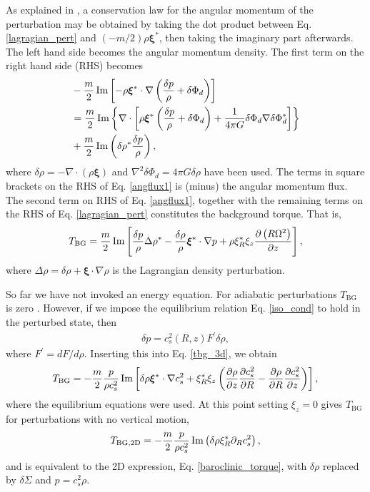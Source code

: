 As explained in \cite{lin11b}, a conservation law for the angular
momentum of the perturbation may be obtained by taking the dot product
between Eq. \ref{lagragian_pert} and $(-m/2)\rho\bm{\xi}^*$, then
taking the imaginary part afterwards. The left hand side becomes the
angular momentum density. The first term on the right hand side (RHS)
becomes 
\begin{align}\label{angflux1}
  &-\frac{m}{2}\operatorname{Im}\left[-\rho\bm{\xi}^*\cdot\nabla\left(\frac{\delta p}{\rho} + \delta
    \Phi_d\right)\right] \notag\\ 
&= \frac{m}{2}\operatorname{Im}\left\{\nabla\cdot\left[\rho\bm{\xi}^*\left(\frac{\delta p}{\rho} + \delta
    \Phi_d \right) + \frac{1}{4\pi
    G}\delta\Phi_d\nabla\delta\Phi_d^*\right]\right\} \notag\\
&+ \frac{m}{2}\operatorname{Im}\left(\delta\rho^*\frac{\delta p}{\rho}\right),
\end{align}
where $\delta\rho = - \nabla\cdot\left(\rho\bm{\xi}\right)$ and
$\nabla^2\delta\Phi_d = 4\pi G \delta \rho$ have been used. The 
terms in square brackets on the RHS of Eq. \ref{angflux1} is (minus) the 
angular momentum flux. The second term on RHS of Eq. \ref{angflux1}, 
together with the remaining terms on the RHS of 
Eq. \ref{lagragian_pert} constitutes the background torque. That is, 
\begin{align}\label{tbg_3d}
  T_\mathrm{BG} = \frac{m}{2}\operatorname{Im}\left[
    \frac{\delta p}{\rho} \Delta\rho^* -
    \frac{\delta\rho}{\rho}\bm{\xi}^*\cdot\nabla p  
    + \rho \xi_R^*\xi_z\frac{\partial\left(R\Omega^2\right)}{\partial z}\right],
\end{align}
where $\Delta\rho = \delta\rho + \bm{\xi}\cdot\nabla\rho$ is the
Lagrangian density perturbation. 

So far we have not invoked an energy equation. For 
adiabatic perturbations $T_\mathrm{BG}$ is zero
\citep{lin93b}. However, if we impose the equilibrium relation
Eq. \ref{iso_cond} to hold in the perturbed state, then
\begin{align}
  \delta p = c_s^2(R,z) F^\prime \delta\rho,
\end{align}
where $F^\prime = dF/d\rho$. Inserting this into Eq. \ref{tbg_3d}, we
obtain
\begin{align}\label{tbg_3d_2}
  T_\mathrm{BG} = -\frac{m}{2}\frac{p}{\rho
    c_s^2}\operatorname{Im}\left[\delta\rho\bm{\xi}^*\cdot\nabla c_s^2 +
    \xi_R^*\xi_z \left(\frac{\partial\rho}{\partial z}\frac{\partial c_s^2}{\partial R} -
      \frac{\partial\rho}{\partial R}\frac{\partial c_s^2}{\partial z}\right)\right],
\end{align}
where the equilibrium equations were used. 
At this point setting $\xi_z=0$ gives $T_\mathrm{BG}$ for
perturbations with no vertical motion, 
\begin{align}
  T_\mathrm{BG,2D} = -\frac{m}{2}\frac{p}{\rho
    c_s^2}\operatorname{Im}\left(\delta\rho \xi_R^*  \partial_R c_s^2 \right),
\end{align}
and is equivalent to the 2D
expression, Eq. \ref{baroclinic_torque}, with $\delta\rho $ replaced
by $\delta \Sigma$ and $p=c_s^2\rho$. %


